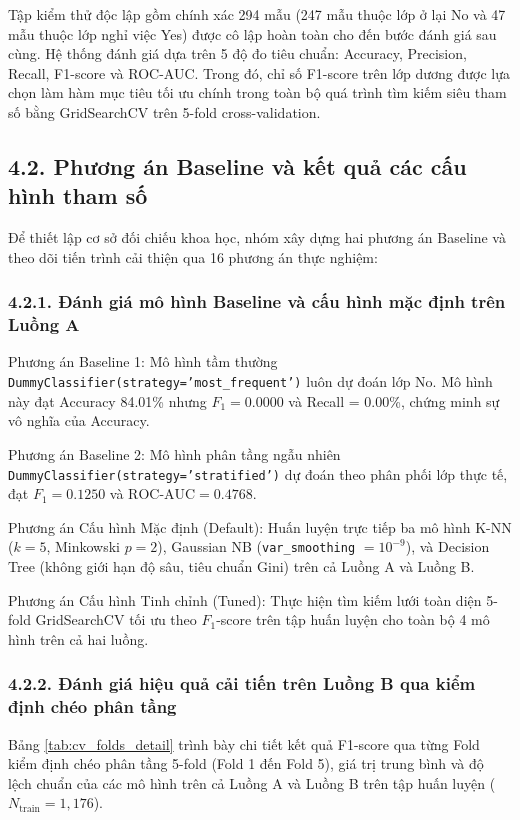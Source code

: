\documentclass[12pt,a4paper]{article}
\begin{document}
Tập kiểm thử độc lập gồm chính xác 294 mẫu (247 mẫu thuộc lớp ở lại No và 47 mẫu thuộc lớp nghỉ việc Yes) được cô lập hoàn toàn cho đến bước đánh giá sau cùng. Hệ thống đánh giá dựa trên 5 độ đo tiêu chuẩn: Accuracy, Precision, Recall, F1-score và ROC-AUC. Trong đó, chỉ số F1-score trên lớp dương được lựa chọn làm hàm mục tiêu tối ưu chính trong toàn bộ quá trình tìm kiếm siêu tham số bằng GridSearchCV trên 5-fold cross-validation.

\subsection{4.2. Phương án Baseline và kết quả các cấu hình tham số}
Để thiết lập cơ sở đối chiếu khoa học, nhóm xây dựng hai phương án Baseline và theo dõi tiến trình cải thiện qua 16 phương án thực nghiệm:

\subsubsection{4.2.1. Đánh giá mô hình Baseline và cấu hình mặc định trên Luồng A}
Phương án Baseline 1: Mô hình tầm thường \texttt{DummyClassifier(strategy='most\_frequent')} luôn dự đoán lớp No. Mô hình này đạt Accuracy 84.01\% nhưng $F_1 = 0.0000$ và Recall = 0.00\%, chứng minh sự vô nghĩa của Accuracy.

Phương án Baseline 2: Mô hình phân tầng ngẫu nhiên \texttt{DummyClassifier(strategy='stratified')} dự đoán theo phân phối lớp thực tế, đạt $F_1 = 0.1250$ và $\text{ROC-AUC} = 0.4768$.

Phương án Cấu hình Mặc định (Default): Huấn luyện trực tiếp ba mô hình K-NN ($k=5$, Minkowski $p=2$), Gaussian NB (\texttt{var\_smoothing} $= 10^{-9}$), và Decision Tree (không giới hạn độ sâu, tiêu chuẩn Gini) trên cả Luồng A và Luồng B.

Phương án Cấu hình Tinh chỉnh (Tuned): Thực hiện tìm kiếm lưới toàn diện 5-fold GridSearchCV tối ưu theo $F_1$-score trên tập huấn luyện cho toàn bộ 4 mô hình trên cả hai luồng.

\subsubsection{4.2.2. Đánh giá hiệu quả cải tiến trên Luồng B qua kiểm định chéo phân tầng}
Bảng \ref{tab:cv_folds_detail} trình bày chi tiết kết quả F1-score qua từng Fold kiểm định chéo phân tầng 5-fold (Fold 1 đến Fold 5), giá trị trung bình và độ lệch chuẩn của các mô hình trên cả Luồng A và Luồng B trên tập huấn luyện ($N_{\text{train}} = 1{,}176$).
\end{document}
